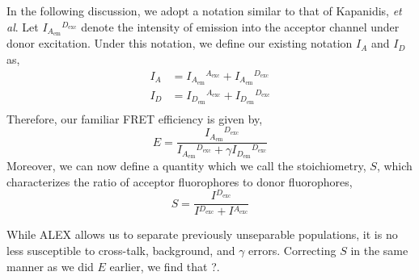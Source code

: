 \documentclass{article}
\newcommand{\emm}[1]{\ensuremath{_{#1_\mathrm{em}}}}
\newcommand{\exc}[1]{\ensuremath{^{#1_\mathrm{exc}}}}
\newcommand{\I}[2]{\ensuremath{I\emm{#1}\exc{#2}}}
\begin{document}
In the following discussion, we adopt a notation similar to that of
Kapanidis, {\it et al}. Let \I{A}{D} denote the intensity of emission
into the acceptor channel under donor excitation. Under this notation,
we define our existing notation $I_A$ and $I_D$ as,
\begin{align*}
  I_A & = \I{A}{A} + \I{A}{D} \\
  I_D & = \I{D}{A} + \I{D}{D} \\
\end{align*}
Therefore, our familiar FRET efficiency is given by,
\[ E = \frac{\I{A}{D}}{\I{A}{D} + \gamma \I{D}{D}} \]
Moreover, we can now define a quantity which we call the
stoichiometry, $S$, which characterizes the ratio of acceptor
fluorophores to donor fluorophores,
\[ S = \frac{I\exc{D}}{I\exc{D} + I\exc{A}} \]

While ALEX allows us to separate previously unseparable populations,
it is no less susceptible to cross-talk, background, and $\gamma$
errors. Correcting $S$ in the same manner as we did $E$ earlier, we
find that ?.
\end{document}
